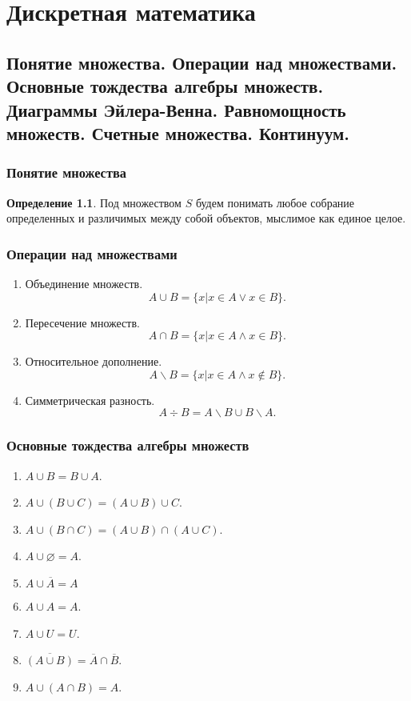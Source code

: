 \documentclass[12pt]{report}
\theoremstyle{definition}
\newtheorem{definition}[theorem]{Определение}
\begin{document}

\chapter{Дискретная математика}
\section
{
  Понятие множества. Операции над множествами.
  Основные тождества алгебры множеств. Диаграммы Эйлера-Венна.
  Равномощность множеств. Счетные множества. Континуум.
}

\subsection{Понятие множества}
\begin{definition}
Под множеством $S$ будем понимать любое собрание определенных
и различимых между собой объектов, мыслимое как единое целое.
\end{definition}

\subsection{Операции над множествами}

\begin{enumerate}
\item Объединение множеств.
$$
  A \cup B = \{x| x \in A \lor x \in B \}.
$$

\item Пересечение множеств.
$$
A \cap B = \{x | x \in A \land x \in B \}.
$$

\item Относительное дополнение.
$$
A \backslash B = \{x | x \in A \land x \notin B \}.
$$

\item Симметрическая разность.
$$
A \div B = A \backslash B \cup B \backslash A.
$$
\end{enumerate}

\subsection{Основные тождества алгебры множеств}

\begin{enumerate}
\item $A \cup B = B \cup A$.
\item $A \cup (B \cup C) = (A \cup B) \cup C$.
\item $A \cup (B \cap C) = (A \cup B) \cap (A \cup C)$.
\item $A \cup \varnothing = A$.
\item $A \cup \overline{A} = A$
\item $A \cup A = A$.
\item $A \cup U = U$.
\item $\overline{ (A \cup B) } = \overline{A} \cap \overline{B}$.
\item $A \cup (A \cap B) = A$.
\end{enumerate}
\end{document}
